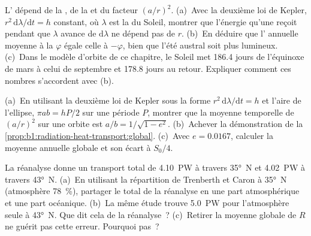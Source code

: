 \begin{exercise}[$\star\star\star$]\label{exo:b1:radiation-heat-transport:10}
L' dépend de la , de la  et du facteur
$(a/r)^2$. (a)~Avec la deuxième loi de Kepler, $r^2\,\mathrm d\lambda/\mathrm dt = h$
constant, où $\lambda$ est la   du Soleil, montrer que l'énergie qu'une
 reçoit pendant que $\lambda$ avance de $\mathrm d\lambda$ ne dépend pas de
$r$. (b)~En déduire que l' annuelle moyenne à la  $\varphi$ égale celle à
$-\varphi$, bien que l'été austral soit plus lumineux. (c)~Dans le modèle d'orbite de ce
chapitre, le Soleil met \num{186.4} jours de l'équinoxe de mars à celui de septembre
et \num{178.8} jours au retour. Expliquer comment ces nombres s'accordent avec (b).
\end{exercise}

\begin{exercise}[$\star\star\star$]\label{exo:b1:radiation-heat-transport:11}
(a)~En utilisant la deuxième loi de Kepler sous la forme $r^2\,\mathrm d\lambda/\mathrm dt = h$
et l'aire de l'ellipse, $\pi a b = hP/2$ sur une période $P$, montrer que la moyenne
temporelle de $(a/r)^2$ sur une orbite est $a/b = 1/\sqrt{1 - e^2}$. (b)~Achever la
démonstration de la \cref{prop:b1:radiation-heat-transport:global}. (c)~Avec $e = 0.0167$,
calculer la moyenne annuelle globale et son écart à $S_0/4$.
\end{exercise}

\begin{exercise}[$\star\star\star$]\label{exo:b1:radiation-heat-transport:12}
La réanalyse donne un transport total de \qty{4.10}{PW} à travers \ang{35}~N et
\qty{4.02}{PW} à travers \ang{43}~N. (a)~En utilisant la répartition de Trenberth et Caron à
\ang{35}~N (atmosphère \qty{78}{\percent}), partager le total de la réanalyse en une part
atmosphérique et une part océanique. (b)~La même étude trouve \qty{5.0}{PW} pour
l'atmosphère seule à \ang{43}~N. Que dit cela de la réanalyse~?
(c)~Retirer la moyenne globale de $R$ ne guérit pas cette erreur. Pourquoi pas~?
\end{exercise}

